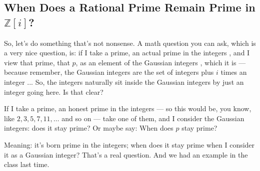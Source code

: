 \subsection{When Does a Rational Prime Remain Prime in \texorpdfstring{$\mathbb{Z}[i]$}{Z[i]}?}

\begin{speech}[00:02:48 - 00:04:08]
So, let's do something that's not nonsense. A math question you can ask, which is a very nice question, is: if I take a prime, an actual prime in the integers , and I view that prime, that $p$, as an element of the Gaussian integers , which it is --- because remember, the Gaussian integers are the set of integers plus $i$ times an integer ... So, the integers naturally sit inside the Gaussian integers  by just an integer going here. Is that clear?

If I take a prime, an honest prime in the integers --- so this would be, you know, like $2, 3, 5, 7, 11, \dots$  and so on --- take one of them, and I consider the Gaussian integers: does it stay prime? Or maybe say: When does $p$ stay prime? 

Meaning: it's born prime in the integers; when does it stay prime when I consider it as a Gaussian integer? That's a real question. And we had an example in the class last time.
\end{speech}

